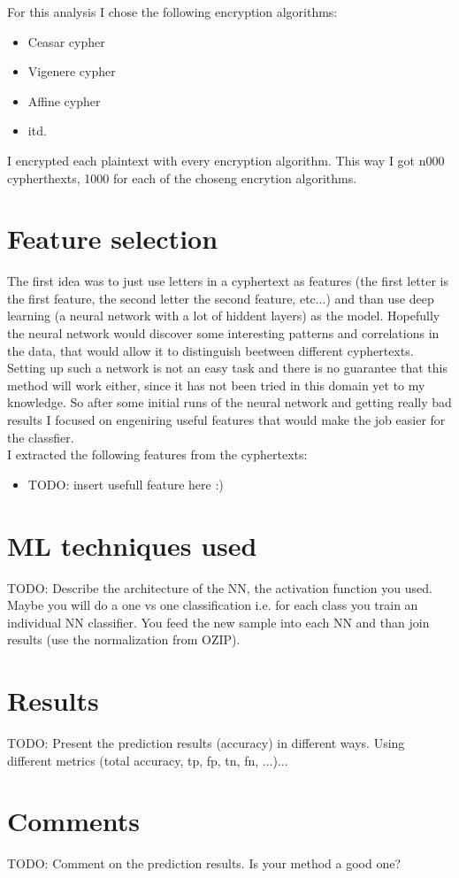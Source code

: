 \documentclass[a4paper]{article}
\begin{document}
For this analysis I chose the following encryption algorithms:

\begin{itemize}
	\item Ceasar cypher
	\item Vigenere cypher
	\item Affine cypher
	\item itd.
\end{itemize}

I encrypted each plaintext with every encryption algorithm. This way I got n000 cypherthexts, 1000 for each of the choseng encrytion algorithms.

\section*{Feature selection}
The first idea was to just use letters in a cyphertext as features (the first letter is the first feature, the second letter the second feature, etc...) and than use deep learning (a neural network with a lot of hiddent layers) as the model. Hopefully the neural network would discover some interesting patterns and correlations in the data, that would allow it to distinguish beetween different cyphertexts. Setting up such a network is not an easy task and there is no guarantee that this method will work either, since it has not been tried in this domain yet to my knowledge. So after some initial runs of the neural network and getting really bad results I focused on engeniring useful features that would make the job easier for the classfier. \\
I extracted the following features from the cyphertexts:

\begin{itemize}
	\item TODO: insert usefull feature here :)
\end{itemize}

\section*{ML techniques used}
TODO: Describe the architecture of the NN, the activation function you used. Maybe you will do a one vs one classification i.e. for each class you train an individual NN classifier. You feed the new sample into each NN and than join results (use the normalization from OZIP).


\section*{Results}
TODO: Present the prediction results (accuracy) in different ways. Using different metrics (total accuracy, tp, fp, tn, fn, ...)...


\section*{Comments}
TODO: Comment on the prediction results. Is your method a good one?



\end{document}
